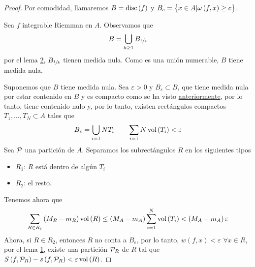 \begin{proof}
    Por comodidad, llamaremos $B = \operatorname{disc}\left( f \right)$ y $B_c = \left\{x \in A
    \vert \omega\left( f, x \right) \geq c\right\}$.

    \bimplies

    Sea $f$ integrable Riemman en $A$. Observamos que
    \[
        B = \bigcup_{k \geq 1} B_{\sfrac{1}{k}}
    \]
    por el lema \hyperref[lema:dos_lebesgue]{2}, $B_{\sfrac{1}{k}}$ tienen medida
    nula. Como es una unión numerable, $B$ tiene medida nula.

    \bimpliedby

    Suponemos que $B$ tiene medida nula. Sea $\varepsilon > 0$ y $B_\varepsilon
    \subset B$, que tiene medida nula por estar contenido en $B$ y es compacto 
    como se ha visto \hyperref[col:lebesgue]{anteriormente}, por lo tanto, tiene contenido nulo y, por lo
    tanto, existen rectángulos compactos $T_1, \dots, T_N \subset A$ tales que
    \[
        B_\varepsilon = \bigcup_{i = 1}{N} T_i \qquad
        \sum_{i=1}{N}\operatorname{vol}\left( T_i \right) < \varepsilon
    \]
    Sea $\mathcal{P}$ una partición de $A$. Separamos los subrectángulos $R$ en los
    siguientes tipos
    \begin{itemize}
        \item $R_1$: $R$ está dentro de algún $T_i$
        \item $R_2$: el resto.
    \end{itemize}

    Tenemos ahora que
    \[
        \sum_{R \in R_1}\left( M_R - m_R \right)\operatorname{vol}\left( R \right) \leq
        \left( M_A -m_A \right)\sum^{N}_{i=1} \operatorname{vol}\left( T_i \right) <
        \left( M_A - m_A \right) \varepsilon
    \]
    Ahora, si $R \in R_2$, entonces $R$ no conta a $B_\varepsilon$, por lo tanto,
    $w(f,x) < \varepsilon$ $\forall x \in R$, por el lema
    \hyperref[lema:uno_lebesgue]{1}, existe una partición $\mathcal{P}_R$ de $R$ tal que
    $S\left( f, \mathcal{P}_R \right) - s\left( f, \mathcal{P}_R \right) < \varepsilon
    \operatorname{vol} \left( R \right)$.


\end{proof}
